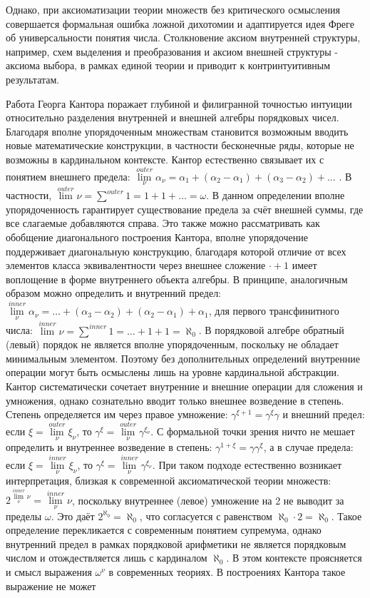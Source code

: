 \documentclass[12pt]{article}
\begin{document}
Однако, при аксиоматизации теории множеств без критического осмысления совершается формальная ошибка ложной дихотомии и адаптируется идея Фреге об универсальности понятия числа. Столкновение аксиом внутренней структуры, например, схем выделения и преобразования и аксиом внешней структуры - аксиома выбора, в рамках единой теории и приводит к контринтуитивным результатам.

Работа Георга Кантора поражает глубиной и филигранной точностью интуиции относительно разделения внутренней и внешней алгебры порядковых чисел. Благодаря вполне упорядоченным множествам становится возможным вводить новые математические конструкции, в частности бесконечные ряды, которые не возможны в кардинальном контексте. Кантор естественно связывает их с понятием внешнего предела: $\lim\limits_{\nu}^{outer} \alpha_{\nu} = \alpha_1 + (\alpha_2 - \alpha_1) + (\alpha_3 - \alpha_2) + \dots$ \cite{cantor-limit}. В частности, $\lim\limits^{outer} \nu =  \sum\limits^{outer} 1 = 1 + 1 + \dots  = \omega$. В данном определении вполне упорядоченность гарантирует существование предела за счёт внешней суммы, где все слагаемые добавляются справа. Это также можно рассматривать как обобщение диагонального построения Кантора, вполне упорядочение поддерживает диагональную конструкцию, благодаря которой отличие от всех элементов класса эквивалентности через внешнее сложение $\cdot + 1$ имеет воплощение в форме внутреннего объекта алгебры. В принципе, аналогичным образом можно определить и внутренний предел: $\lim\limits_{\nu}^{inner} \alpha_{\nu} = \dots + (\alpha_3 - \alpha_2) + (\alpha_2 - \alpha_1) + \alpha_1$, для первого трансфинитного числа: $\lim\limits^{inner} \nu =  \sum\limits^{inner} 1 = \dots + 1 + 1 = \aleph_0$. В порядковой алгебре обратный (левый) порядок не является вполне упорядоченным, поскольку не обладает минимальным элементом. Поэтому без дополнительных определений внутренние операции могут быть осмыслены лишь на уровне кардинальной абстракции. Кантор систематически сочетает внутренние и внешние операции для сложения и умножения, однако сознательно вводит только внешнее возведение в степень. Степень определяется им через правое умножение: $\gamma^{\xi + 1} = \gamma^{\xi}\gamma$ и внешний предел: если $\xi = \lim\limits_{\nu}^{outer} \xi_{\nu}$, то $\gamma^{\xi} = \lim\limits_{\nu}^{outer} \gamma^{\xi_{\nu}}$. С формальной точки зрения ничто не мешает определить и внутреннее возведение в степень: $\gamma^{1 + \xi} = \gamma\gamma^{\xi}$, а в случае предела: если $\xi = \lim\limits_{\nu}^{inner} \xi_{\nu}$, то $\gamma^{\xi} = \lim\limits_{\nu}^{inner} \gamma^{\xi_{\nu}}$. При таком подходе естественно возникает интерпретация, близкая к современной аксиоматической теории множеств: $2^{\lim\limits_{\nu}^{inner} \nu} = \lim\limits_{\nu}^{inner} \nu$, поскольку внутреннее (левое) умножение на 2 не выводит за пределы $\omega$. Это даёт $2^{\aleph_0} = \aleph_0$, что согласуется с равенством $\aleph_0 \cdot 2 = \aleph_0$. Такое определение перекликается с современным понятием супремума, однако внутренний предел в рамках порядковой арифметики не является порядковым числом и отождествляется лишь с кардиналом $\aleph_0$. В этом контексте проясняется и смысл выражения $\omega^{\nu}$ в современных теориях. В построениях Кантора такое выражение не может 
\end{document}
